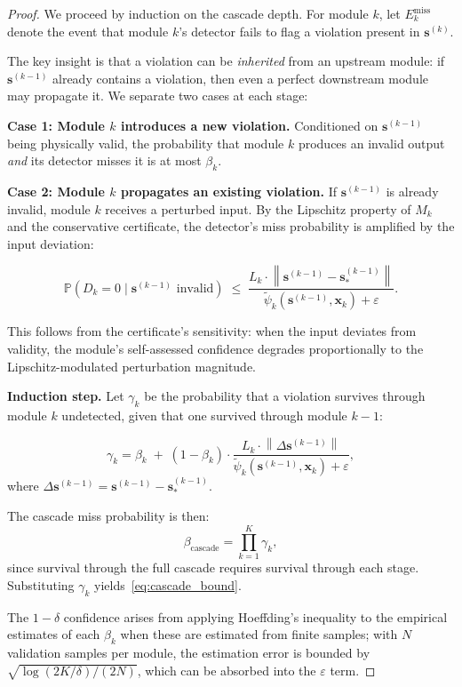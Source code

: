 \documentclass[11pt,twocolumn]{article}
\theoremstyle{definition}
\newcommand{\Pbb}{\mathbb{P}}
\newcommand{\norm}[1]{\left\lVert#1\right\rVert}
\begin{document}
\begin{proof}
We proceed by induction on the cascade depth.  For module $k$, let
$E_k^{\text{miss}}$ denote the event that module $k$'s detector fails to flag
a violation present in $\mathbf{s}^{(k)}$.

The key insight is that a violation can be \emph{inherited} from an upstream
module: if $\mathbf{s}^{(k-1)}$ already contains a violation, then even a
perfect downstream module may propagate it.  We separate two cases at each
stage:

\medskip\noindent
\textbf{Case 1: Module $k$ introduces a new violation.}
Conditioned on $\mathbf{s}^{(k-1)}$ being physically valid, the probability
that module $k$ produces an invalid output \emph{and} its detector misses it
is at most $\beta_k$.

\medskip\noindent
\textbf{Case 2: Module $k$ propagates an existing violation.}
If $\mathbf{s}^{(k-1)}$ is already invalid, module $k$ receives a
perturbed input.  By the Lipschitz property of $M_k$ and the conservative
certificate, the detector's miss probability is amplified by the input
deviation:

\begin{equation}
  \Pbb(D_k = 0 \mid \mathbf{s}^{(k-1)} \text{ invalid})
  \;\le\; \frac{L_k \cdot \norm{\mathbf{s}^{(k-1)} - \mathbf{s}^{(k-1)}_*}}
                {\tilde{\psi}_k(\mathbf{s}^{(k-1)}, \mathbf{x}_k) + \varepsilon}.
\end{equation}

This follows from the certificate's sensitivity: when the input deviates from
validity, the module's self-assessed confidence degrades proportionally to the
Lipschitz-modulated perturbation magnitude.

\medskip\noindent
\textbf{Induction step.}
Let $\gamma_k$ be the probability that a violation survives through module
$k$ undetected, given that one survived through module $k-1$:

\begin{equation}
  \gamma_k = \beta_k \;+\; (1-\beta_k) \cdot
    \frac{L_k \cdot \norm{\Delta\mathbf{s}^{(k-1)}}}
         {\tilde{\psi}_k(\mathbf{s}^{(k-1)}, \mathbf{x}_k) + \varepsilon},
\end{equation}
where $\Delta\mathbf{s}^{(k-1)} = \mathbf{s}^{(k-1)} - \mathbf{s}^{(k-1)}_*$.

The cascade miss probability is then:
\begin{equation}
  \beta_{\text{cascade}} = \prod_{k=1}^{K} \gamma_k,
\end{equation}
since survival through the full cascade requires survival through each stage.
Substituting $\gamma_k$ yields~\eqref{eq:cascade_bound}.

The $1-\delta$ confidence arises from applying Hoeffding's inequality to the
empirical estimates of each $\beta_k$ when these are estimated from finite
samples; with $N$ validation samples per module, the estimation error is
bounded by $\sqrt{\log(2K/\delta)/(2N)}$, which can be absorbed into the
$\varepsilon$ term.
\end{proof}
\end{document}
